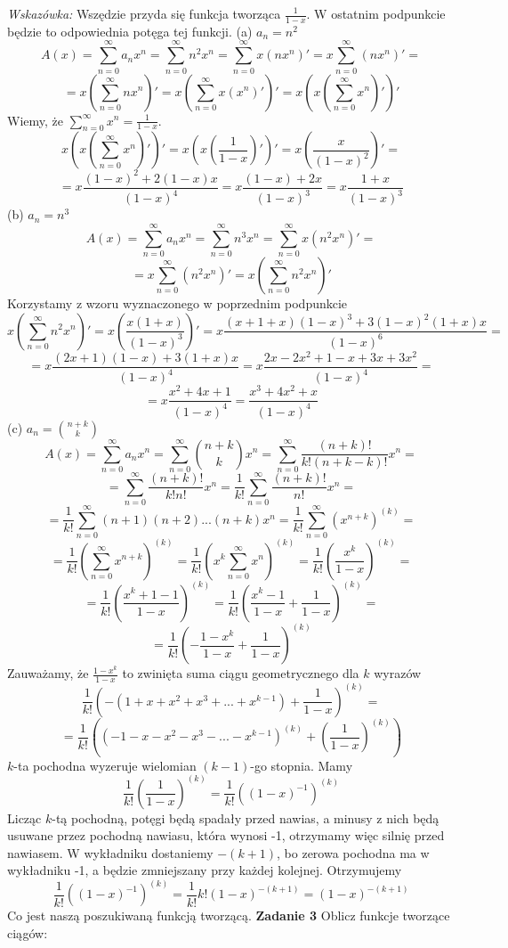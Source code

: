 \documentclass[12pt,a4paper]{article}
\begin{document}
\textit{Wskazówka:} Wszędzie przyda się funkcja tworząca \( \frac{1}{1-x} \). W ostatnim podpunkcie będzie to odpowiednia potęga tej funkcji.
\vskip 0.5cm
\noindent
(a) \(a_n = n^2\)
\[
	A(x) = \sum_{n=0}^\infty a_nx^n = \sum_{n=0}^\infty n^2x^n = \sum_{n=0}^\infty x(nx^n)' 
	= x\sum_{n=0}^\infty (nx^n)' =
\]
\[
	= x \left( \sum_{n=0}^\infty nx^n \right)' 
	= x \left( \sum_{n=0}^\infty x(x^n)' \right)'
	= x \left( x \left(\sum_{n=0}^\infty x^n\right)' \right)'
\]
Wiemy, że \( \sum_{n=0}^\infty x^n = \frac{1}{1-x}\).
\[
	x \left( x \left(\sum_{n=0}^\infty x^n\right)' \right)'
	= x \left( x \left( \frac{1}{1-x} \right)' \right)'
	= x \left( \frac{x}{(1-x)^2} \right)' = 
\]
\[
	= x \frac{(1-x)^2 + 2(1-x)x}{(1-x)^4} 
	= x \frac{(1-x) + 2x}{(1-x)^3} 
	= x \frac{1 + x}{(1-x)^3} 
\]
\vskip 0.5cm
\noindent
(b) \(a_n = n^3\)
\[
	A(x) 
	= \sum_{n=0}^\infty a_nx^n 
	= \sum_{n=0}^\infty n^3x^n 
	= \sum_{n=0}^\infty x(n^2x^n)' =
\]
\[
	= x\sum_{n=0}^\infty (n^2x^n)' = x \left(\sum_{n=0}^\infty n^2x^n\right)'
\]
Korzystamy z wzoru wyznaczonego w poprzednim podpunkcie
\[
	x \left(\sum_{n=0}^\infty n^2x^n\right)' 
	= x \left(  \frac{x(1 + x)}{(1-x)^3} \right)'
	= x  \frac{(x + 1 + x)(1-x)^3 + 3(1-x)^2(1+x)x}{(1-x)^6} =
\]
\[
	= x  \frac{(2x + 1)(1-x) + 3(1+x)x}{(1-x)^4} 
	= x  \frac{2x - 2x^2 + 1 - x + 3x + 3x^2}{(1-x)^4} =
\]
\[
	= x  \frac{x^2 + 4x + 1 }{(1-x)^4}
	= \frac{x^3 + 4x^2 + x }{(1-x)^4}
\]
\vskip 0.5cm
\noindent
(c) \(a_n = \binom{n+k}{k}\)
\[
	A(x) 
	= \sum_{n=0}^\infty a_nx^n 
	= \sum_{n=0}^\infty \binom{n+k}{k} x^n 
	= \sum_{n=0}^\infty \frac{(n+k)!}{k!(n+k-k)!} x^n =
\]
\[
	= \sum_{n=0}^\infty \frac{(n+k)!}{k!n!} x^n 
	= \frac{1}{k!} \sum_{n=0}^\infty \frac{(n+k)!}{n!} x^n =
\]
\[
	= \frac{1}{k!} \sum_{n=0}^\infty (n+1)(n+2)...(n+k) x^n 
	= \frac{1}{k!} \sum_{n=0}^\infty (x^{n+k})^{(k)} =
\]
\[
	= \frac{1}{k!} \left( \sum_{n=0}^\infty x^{n+k} \right)^{(k)} 
	= \frac{1}{k!} \left( x^k \sum_{n=0}^\infty x^{n} \right)^{(k)}
	= \frac{1}{k!} \left( \frac{x^k}{1-x} \right)^{(k)} =
\]
\[
	= \frac{1}{k!} \left( \frac{x^k + 1 - 1}{1-x} \right)^{(k)}
	= \frac{1}{k!} \left( \frac{x^k - 1}{1-x} + \frac{1}{1-x} \right)^{(k)} =
\]
\[
	= \frac{1}{k!} \left( -\frac{1 - x^k}{1-x} + \frac{1}{1-x} \right)^{(k)} 
\]
Zauważamy, że \( \frac{1 - x^k}{1-x} \) to zwinięta suma ciągu geometrycznego dla \( k \) wyrazów
\[
	\frac{1}{k!} \left( -(1 + x + x^2 + x^3 + ... + x^{k-1}) + \frac{1}{1-x} \right)^{(k)} =
\]
\[
	= \frac{1}{k!} \left( (-1 - x - x^2 - x^3 - ... - x^{k-1})^{(k)} 
	+ \left( \frac{1}{1-x} \right)^{(k)} \right) 
\]
\(k\)-ta pochodna wyzeruje wielomian \( (k-1) \)-go stopnia. Mamy
\[
	\frac{1}{k!} \left( \frac{1}{1-x} \right)^{(k)}  = \frac{1}{k!} \left( (1-x)^{-1} \right)^{(k)}
\]
Licząc \(k\)-tą pochodną, potęgi będą spadały przed nawias, a minusy z nich będą usuwane przez pochodną nawiasu, która wynosi -1, otrzymamy więc silnię przed nawiasem. W wykładniku dostaniemy \(-(k+1)\), bo zerowa pochodna ma w wykładniku -1, a będzie zmniejszany przy każdej kolejnej. Otrzymujemy
\[
	\frac{1}{k!} \left( (1-x)^{-1} \right)^{(k)} = \frac{1}{k!} k!(1-x)^{-(k+1)} = (1-x)^{-(k+1)}
\]
Co jest naszą poszukiwaną funkcją tworzącą.
\vskip 0.5cm
\noindent
\textbf{Zadanie 3} Oblicz funkcje tworzące ciągów:
\end{document}
